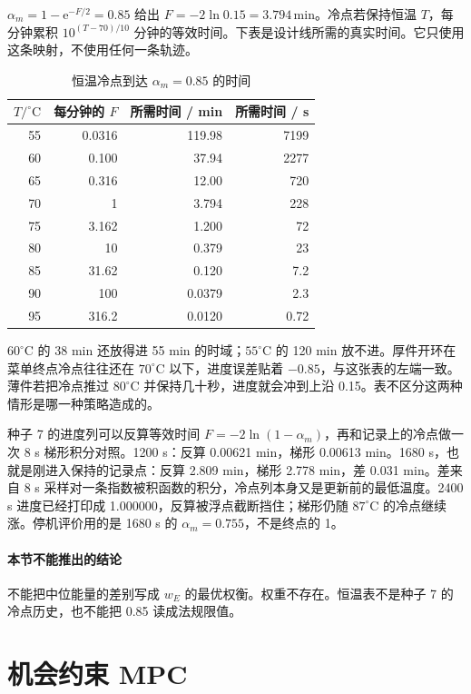 \(\alpha_m=1-\mathrm{e}^{-F/2}=0.85\) 给出 \(F=-2\ln 0.15=3.794\,\mathrm{min}\)。冷点若保持恒温 \(T\)，每分钟累积 \(10^{(T-70)/10}\) 分钟的等效时间。下表是设计线所需的真实时间。它只使用这条映射，不使用任何一条轨迹。

\begin{table}[ht]
\centering
\caption{恒温冷点到达 \(\alpha_m=0.85\) 的时间}
\begin{tabular}{rrrr}
\toprule
\(T/^\circ\mathrm{C}\) & 每分钟的 \(F\) & 所需时间 / min & 所需时间 / s \\
\midrule
55 & 0.0316 & 119.98 & 7199 \\
60 & 0.100 & 37.94 & 2277 \\
65 & 0.316 & 12.00 & 720 \\
70 & 1 & 3.794 & 228 \\
75 & 3.162 & 1.200 & 72 \\
80 & 10 & 0.379 & 23 \\
85 & 31.62 & 0.120 & 7.2 \\
90 & 100 & 0.0379 & 2.3 \\
95 & 316.2 & 0.0120 & 0.72 \\
\bottomrule
\end{tabular}
\end{table}

\(60^\circ\mathrm{C}\) 的 38 min 还放得进 55 min 的时域；\(55^\circ\mathrm{C}\) 的 120 min 放不进。厚件开环在菜单终点冷点往往还在 \(70^\circ\mathrm{C}\) 以下，进度误差贴着 \(-0.85\)，与这张表的左端一致。薄件若把冷点推过 \(80^\circ\mathrm{C}\) 并保持几十秒，进度就会冲到上沿 0.15。表不区分这两种情形是哪一种策略造成的。

种子 7 的进度列可以反算等效时间 \(F=-2\ln(1-\alpha_m)\)，再和记录上的冷点做一次 8 s 梯形积分对照。1200 s：反算 0.00621 min，梯形 0.00613 min。1680 s，也就是刚进入保持的记录点：反算 2.809 min，梯形 2.778 min，差 0.031 min。差来自 8 s 采样对一条指数被积函数的积分，冷点列本身又是更新前的最低温度。2400 s 进度已经打印成 1.000000，反算被浮点截断挡住；梯形仍随 \(87^\circ\mathrm{C}\) 的冷点继续涨。停机评价用的是 1680 s 的 \(\alpha_m=0.755\)，不是终点的 1。

\paragraph{本节不能推出的结论}
不能把中位能量的差别写成 \(w_E\) 的最优权衡。权重不存在。恒温表不是种子 7 的冷点历史，也不能把 0.85 读成法规限值。

\section{机会约束 MPC}

